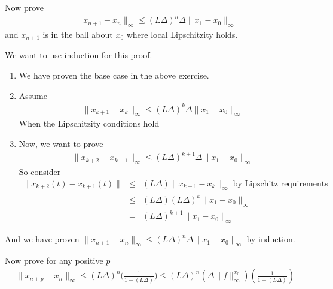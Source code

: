 \documentclass[11pt]{SelfArxOneColBMN}
\begin{document}
\begin{exercise}
Now prove
\begin{eqnarray*}
\|x_{n+1} - x_n\|_\infty \leq (L \Delta)^n  \Delta  \|x_1 - x_0\|_\infty
\end{eqnarray*}
\noindent
and $x_{n+1}$ is in the ball about $x_0$ where local Lipschitzity holds.
\end{exercise}

\begin{solution}
We want to use induction for this proof.
\begin{enumerate}
  \item We have proven the base case in the above exercise.
  \item Assume
  \begin{eqnarray*}
    \|x_{k+1} - x_{k} \|_\infty \leq (L\Delta)^k\Delta\|x_1 - x_0\|_\infty
  \end{eqnarray*}
  When the Lipschitzity conditions hold
  \item Now, we want to prove
  \begin{eqnarray*}
    \|x_{k+2} - x_{k+1} \|_\infty \leq (L\Delta)^{k+1}\Delta\|x_1 - x_0\|_\infty
  \end{eqnarray*}
  So consider
  \begin{eqnarray*}
    \|x_{k+2}(t) - x_{k+1}(t) \| &\leq& (L\Delta)\|x_{k+1} - x_k\|_\infty \; \text{by Lipschitz requirements}\\
    &\leq& (L\Delta)(L\Delta)^k\|x_1 - x_0\|_\infty\\
    &=& (L\Delta)^{k+1}\|x_1 - x_0\|_\infty
  \end{eqnarray*}
\end{enumerate}
And we have proven $\|x_{n+1} - x_n\|_\infty \leq (L \Delta)^n  \Delta  \|x_1 - x_0\|_\infty$ by induction.
\end{solution}

\begin{exercise}
Now prove for any positive $p$
\begin{eqnarray*}
\|x_{n+p} - x_n\|_\infty \leq (L \Delta)^n  \biggl ( \frac{1}{1 - (L \Delta)} \biggr)\leq(L\Delta)^n(\Delta\|f\|_\infty^{x_0})(\frac{1}{1 - (L\Delta)})
\end{eqnarray*}
\end{exercise}
\end{document}
